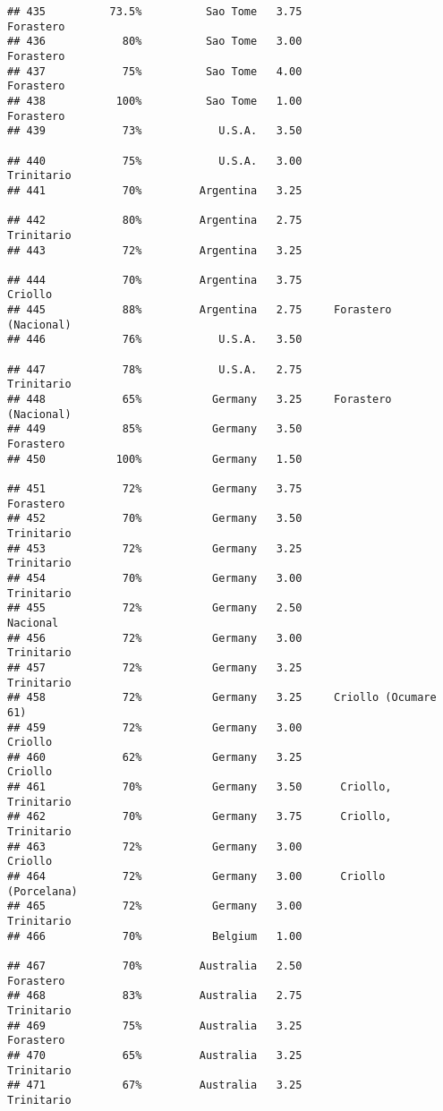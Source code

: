 \documentclass[
]{article}
\begin{document}
\begin{verbatim}
## 435          73.5%          Sao Tome   3.75                Forastero
## 436            80%          Sao Tome   3.00                Forastero
## 437            75%          Sao Tome   4.00                Forastero
## 438           100%          Sao Tome   1.00                Forastero
## 439            73%            U.S.A.   3.50                         
## 440            75%            U.S.A.   3.00               Trinitario
## 441            70%         Argentina   3.25                         
## 442            80%         Argentina   2.75               Trinitario
## 443            72%         Argentina   3.25                         
## 444            70%         Argentina   3.75                  Criollo
## 445            88%         Argentina   2.75     Forastero (Nacional)
## 446            76%            U.S.A.   3.50                         
## 447            78%            U.S.A.   2.75               Trinitario
## 448            65%           Germany   3.25     Forastero (Nacional)
## 449            85%           Germany   3.50                Forastero
## 450           100%           Germany   1.50                         
## 451            72%           Germany   3.75                Forastero
## 452            70%           Germany   3.50               Trinitario
## 453            72%           Germany   3.25               Trinitario
## 454            70%           Germany   3.00               Trinitario
## 455            72%           Germany   2.50                 Nacional
## 456            72%           Germany   3.00               Trinitario
## 457            72%           Germany   3.25               Trinitario
## 458            72%           Germany   3.25     Criollo (Ocumare 61)
## 459            72%           Germany   3.00                  Criollo
## 460            62%           Germany   3.25                  Criollo
## 461            70%           Germany   3.50      Criollo, Trinitario
## 462            70%           Germany   3.75      Criollo, Trinitario
## 463            72%           Germany   3.00                  Criollo
## 464            72%           Germany   3.00      Criollo (Porcelana)
## 465            72%           Germany   3.00               Trinitario
## 466            70%           Belgium   1.00                         
## 467            70%         Australia   2.50                Forastero
## 468            83%         Australia   2.75               Trinitario
## 469            75%         Australia   3.25                Forastero
## 470            65%         Australia   3.25               Trinitario
## 471            67%         Australia   3.25               Trinitario

\end{verbatim}
\end{document}
